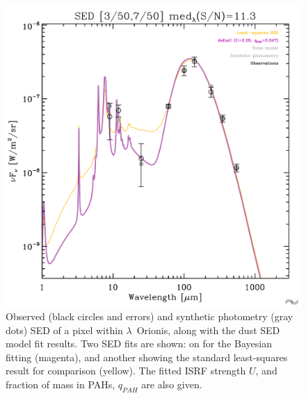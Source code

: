               \begin{figure}
                \includegraphics[width=\textwidth/2]{../Plots/ch_lori/fred_LOri_notes_Oct2017_fig1a.pdf}
                \centering
                \caption{Observed (black circles and errors) and synthetic photometry (gray dots) SED of a pixel within $\lambda$~Orionis, along with the dust SED model fit results. Two SED fits are shown: on for the Bayesian fitting (magenta), and another showing the standard least-squares result for comparison (yellow). The fitted ISRF strength $U$, and fraction of mass in PAHs, $q_{PAH}$ are also given.}
                \label{fig:fred_LOri_notes_Oct2017_fig1a}
              \end{figure}
